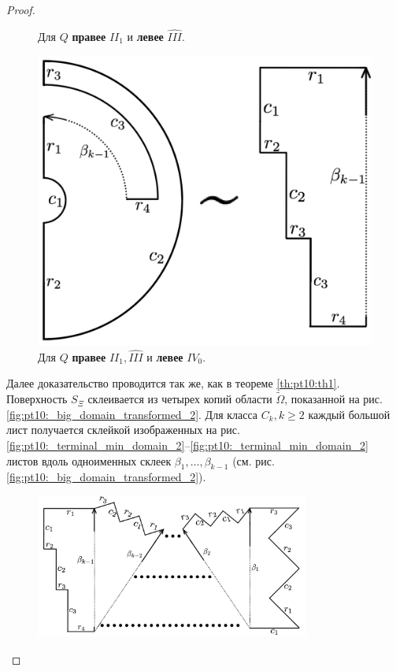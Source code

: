 \begin{proof}
\begin{figure}[!htb]
    \caption{Для $Q$ \textbf{правее} $II_1$ и \textbf{левее} $\widehat{III}$.}
    \label{fig:pt10:_branching_domain_2}
\endminipage\hfill
{}
\centering
\includegraphics[scale=0.1]{images/section3_circular/atoms/branching/terminal_max_transformed_2.pdf}
    \caption{Для $Q$ \textbf{правее} $II_1, \widehat{III}$ и \textbf{левее} $IV_0$.}
    \label{fig:pt10:_terminal_max_domain_2}
\endminipage\hfill
\end{figure}

Далее доказательство проводится так же, как в теореме \ref{th:pt10:th1}. Поверхность $S_\Xi$ склеивается из четырех копий области $\widetilde{\Omega}$, показанной на рис. \ref{fig:pt10:_big_domain_transformed_2}. 
Для класса $C_k, k \geq 2$ каждый большой лист получается склейкой изображенных на рис. \ref{fig:pt10:_terminal_min_domain_2}--\ref{fig:pt10:_terminal_min_domain_2} листов вдоль одноименных склеек $\beta_1, \ldots, \beta_{k-1}$ (см. рис. \ref{fig:pt10:_big_domain_transformed_2}).

\begin{figure}[!htb]
\centering
\includegraphics[width=9cm]{images/section3_circular/atoms/branching/big_domain_transformed_2.pdf}
    \caption{}


\end{figure}
\end{proof}
